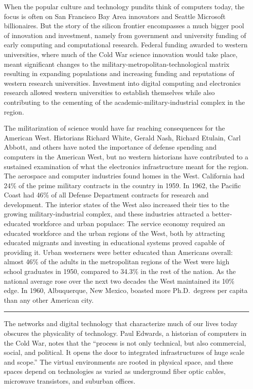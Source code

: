 \documentclass[11pt,article,oneside]{memoir}
\begin{document}
When the popular culture and technology pundits think of computers
today, the focus is often on San Francisco Bay Area innovators and
Seattle Microsoft billionaires. But the story of the silicon frontier
encompasses a much bigger pool of innovation and investment, namely from
government and university funding of early computing and computational
research. Federal funding awarded to western universities, where much of
the Cold War science innovation would take place, meant significant
changes to the military-metropolitan-technological matrix resulting in
expanding populations and increasing funding and reputations of western
research universities. Investment into digital computing and electronics
research allowed western universities to establish themselves while also
contributing to the cementing of the academic-military-industrial
complex in the region.

The militarization of science would have far reaching consequences for
the American West. Historians Richard White, Gerald Nash, Richard
Etulain, Carl Abbott, and others have noted the importance of defense
spending and computers in the American West, but no western historians
have contributed to a sustained examination of what the electronics
infrastructure meant for the region. The aerospace and computer
industries found homes in the West. California had 24\% of the prime
military contracts in the country in 1959. In 1962, the Pacific Coast
had 46\% of all Defense Department contracts for research and
development. The interior states of the West also increased their ties
to the growing military-industrial complex, and these industries
attracted a better-educated workforce and urban populace: The service
economy required an educated workforce and the urban regions of the
West, both by attracting educated migrants and investing in educational
systems proved capable of providing it. Urban westerners were better
educated than Americans overall: almost 46\% of the adults in the
metropolitan regions of the West were high school graduates in 1950,
compared to 34.3\% in the rest of the nation. As the national average
rose over the next two decades the West maintained its 10\% edge. In
1960, Albuquerque, New Mexico, boasted more Ph.D.~degrees per capita
than any other American city.

\begin{center}\rule{3in}{0.4pt}\end{center}

The networks and digital technology that characterize much of our lives
today obscures the physicality of technology. Paul Edwards, a historian
of computers in the Cold War, notes that the ``process is not only
technical, but also commercial, social, and political. It opens the door
to integrated infrastructures of huge scale and scope.'' The virtual
environments are rooted in physical space, and these spaces depend on
technologies as varied as underground fiber optic cables, microwave
transistors, and suburban offices.
\end{document}
